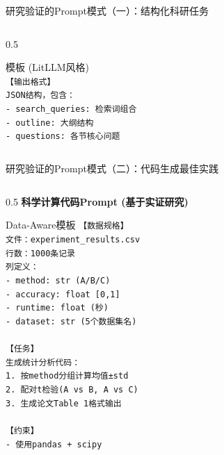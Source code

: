 \documentclass[aspectratio=169,11pt]{beamer}
\begin{document}
\begin{frame}[fragile]{研究验证的Prompt模式（一）：结构化科研任务}
\begin{columns}
\begin{column}{0.5\textwidth}
\begin{exampleblock}{模板 (LitLLM风格)}
                \texttt{}\\
                \texttt{【输出格式】}\\
                \texttt{JSON结构，包含：}\\
                \texttt{- search\_queries: 检索词组合}\\
                \texttt{- outline: 大纲结构}\\
                \texttt{- questions: 各节核心问题}
            \end{exampleblock}
        \end{column}
    \end{columns}
\end{frame}

\begin{frame}[fragile]{研究验证的Prompt模式（二）：代码生成最佳实践}
    \begin{columns}
        \begin{column}{0.5\textwidth}
            \textbf{科学计算代码Prompt (基于实证研究)}
            \begin{exampleblock}{Data-Aware模板}
                \scriptsize
                \texttt{【数据规格】}\\
                \texttt{文件：experiment\_results.csv}\\
                \texttt{行数：1000条记录}\\
                \texttt{列定义：}\\
                \texttt{- method: str (A/B/C)}\\
                \texttt{- accuracy: float [0,1]}\\
                \texttt{- runtime: float (秒)}\\
                \texttt{- dataset: str (5个数据集名)}\\
                \texttt{}\\
                \texttt{【任务】}\\
                \texttt{生成统计分析代码：}\\
                \texttt{1. 按method分组计算均值±std}\\
                \texttt{2. 配对t检验(A vs B, A vs C)}\\
                \texttt{3. 生成论文Table 1格式输出}\\
                \texttt{}\\
                \texttt{【约束】}\\
                \texttt{- 使用pandas + scipy}\\

\end{exampleblock}
\end{column}
\end{columns}
\end{frame}
\end{document}
